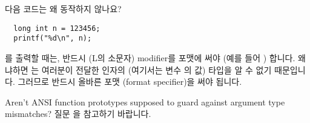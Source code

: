 \begin{faq}
	다음 코드는 왜 동작하지 않나요?
\begin{verbatim}
  long int n = 123456;
  printf("%d\n", n);
\end{verbatim}

\A
	를 출력할 때는, 반드시  (L의 소문자) modifier를
	 포맷에 써야 (예를 들어 ) 합니다.
	왜냐하면 는 여러분이 전달한 인자의 (여기서는 변수 의
	값) 타입을 알 수 없기 때문입니다.  그러므로 반드시 올바른
	포맷 (format specifier)을 써야 됩니다.
\end{faq}

\begin{faq}
	Aren't ANSI function prototypes supposed to guard against argument
	type mismatches?
\A
	질문 을 참고하기 바랍니다.
\end{faq}

